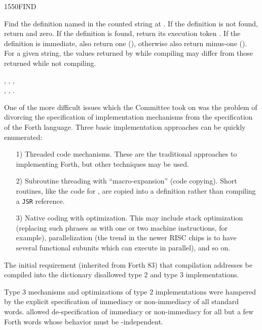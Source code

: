 \begin{worddef}{1550}{FIND}
\item {}

	Find the definition named in the counted string at .
	If the definition is not found, return  and zero.
	If the definition is found, return its execution token .
	If the definition is immediate, also return one (),
	otherwise also return minus-one (). For a given string,
	the values returned by  while compiling may differ
	from those returned while not compiling.

\see {},
	,
	, \\
	,
	,
	.

	\begin{rationale} %
		One of the more difficult issues which the Committee took on
		was the problem of divorcing the specification of
		implementation mechanisms from the specification of the
		Forth language. Three basic implementation approaches can be
		quickly enumerated:

		\begin{enumerate}
		\item[1)] Threaded code mechanisms.
			These are the traditional approaches to implementing Forth,
			but other techniques may be used.

		\item[2)] Subroutine threading with ``macro-expansion'' (code
			copying). Short routines, like the code for ,
			are copied into a definition rather than compiling a
			\texttt{JSR} reference.

		\item[3)] Native coding with optimization.
			This may include stack optimization (replacing such phrases
			as   \word{+} with one or two machine
			instructions, for example), parallelization (the trend in
			the newer RISC chips is to have several functional subunits
			which can execute in parallel), and so on.
		\end{enumerate}

		The initial requirement (inherited from Forth 83) that
		compilation addresses be compiled into the dictionary
		disallowed type 2 and type 3 implementations.

		Type 3 mechanisms and optimizations of type 2 implementations
		were hampered by the explicit specification of immediacy or
		non-immediacy of all standard words.  allowed
		de-spec\-i\-fi\-ca\-tion of immediacy or non-immediacy for all but a
		few Forth words whose behavior must be -independent.


\end{rationale}
\end{worddef}
